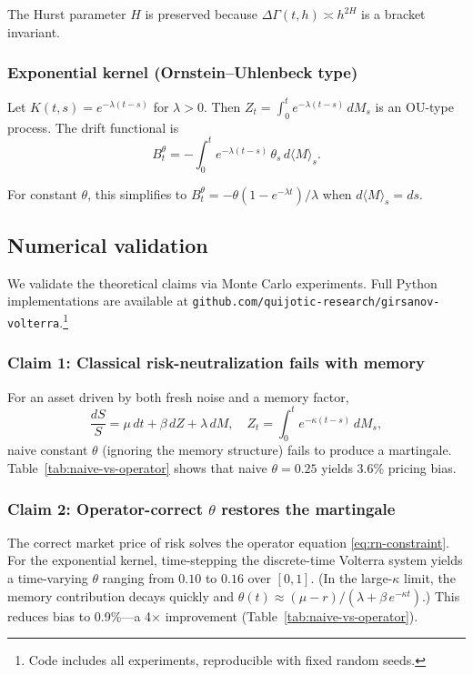 \documentclass[11pt]{article}
\theoremstyle{plain}
\theoremstyle{definition}
\theoremstyle{remark}
\newcommand{\dGamma}{\Delta\Gamma}
\newcommand{\bracket}[1]{\langle #1 \rangle}
\begin{document}
The Hurst parameter $H$ is preserved because $\dGamma(t,h) \asymp h^{2H}$ is
a bracket invariant.

\subsubsection{Exponential kernel (Ornstein--Uhlenbeck type)}

Let $K(t,s) = e^{-\lambda(t-s)}$ for $\lambda > 0$. Then
$Z_t = \int_0^t e^{-\lambda(t-s)}\,dM_s$ is an OU-type process. The drift
functional is
\[
B_t^\theta = -\int_0^t e^{-\lambda(t-s)}\,\theta_s\,d\bracket{M}_s.
\]

For constant $\theta$, this simplifies to $B_t^\theta = -\theta(1 - e^{-\lambda t})/\lambda$
when $d\bracket{M}_s = ds$.

\subsection{Numerical validation}

We validate the theoretical claims via Monte Carlo experiments. Full Python
implementations are available at \texttt{github.com/quijotic-research/girsanov-volterra}.\footnote{Code includes all experiments, reproducible with fixed random seeds.}

\subsubsection{Claim 1: Classical risk-neutralization fails with memory}

For an asset driven by both fresh noise and a memory factor,
\[
\frac{dS}{S} = \mu\,dt + \beta\,dZ + \lambda\,dM,
\quad Z_t = \int_0^t e^{-\kappa(t-s)}\,dM_s,
\]
naive constant $\theta$ (ignoring the memory structure) fails to produce a
martingale. Table~\ref{tab:naive-vs-operator} shows that naive $\theta = 0.25$
yields 3.6\% pricing bias.

\subsubsection{Claim 2: Operator-correct $\theta$ restores the martingale}

The correct market price of risk solves the operator equation
\eqref{eq:rn-constraint}. For the exponential kernel, time-stepping the
discrete-time Volterra system yields a time-varying $\theta$ ranging from
$0.10$ to $0.16$ over $[0,1]$. (In the large-$\kappa$ limit, the memory
contribution decays quickly and $\theta(t) \approx (\mu - r)/(\lambda + \beta\,e^{-\kappa t})$.)
This reduces bias to 0.9\%---a
4$\times$ improvement (Table~\ref{tab:naive-vs-operator}).
\end{document}
